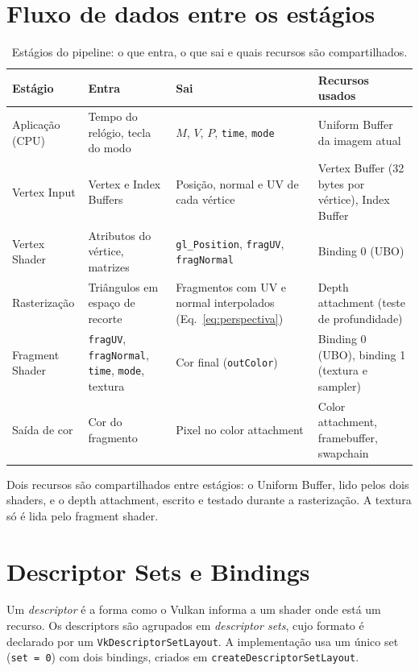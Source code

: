 \section{Fluxo de dados entre os estágios}

\begin{table}[H]
\centering
\caption{Estágios do pipeline: o que entra, o que sai e quais recursos são compartilhados.}
\label{tab:estagios}
\small
\begin{tabular}{p{2.5cm}p{3.6cm}p{3.6cm}p{4.1cm}}
\toprule
\textbf{Estágio} & \textbf{Entra} & \textbf{Sai} & \textbf{Recursos usados} \\
\midrule
Aplicação (CPU) & Tempo do relógio, tecla do modo & \(M\), \(V\), \(P\), \texttt{time}, \texttt{mode} & Uniform Buffer da imagem atual \\
Vertex Input & Vertex e Index Buffers & Posição, normal e UV de cada vértice & Vertex Buffer (32 bytes por vértice), Index Buffer \\
Vertex Shader & Atributos do vértice, matrizes & \texttt{gl\_Position}, \texttt{fragUV}, \texttt{fragNormal} & Binding 0 (UBO) \\
Rasterização & Triângulos em espaço de recorte & Fragmentos com UV e normal interpolados (Eq.~\ref{eq:perspectiva}) & Depth attachment (teste de profundidade) \\
Fragment Shader & \texttt{fragUV}, \texttt{fragNormal}, \texttt{time}, \texttt{mode}, textura & Cor final (\texttt{outColor}) & Binding 0 (UBO), binding 1 (textura e sampler) \\
Saída de cor & Cor do fragmento & Pixel no color attachment & Color attachment, framebuffer, swapchain \\
\bottomrule
\end{tabular}
\end{table}

Dois recursos são compartilhados entre estágios: o Uniform Buffer, lido pelos dois shaders, e o depth attachment, escrito e testado durante a rasterização. A textura só é lida pelo fragment shader.

\section{Descriptor Sets e Bindings}

Um \textit{descriptor} é a forma como o Vulkan informa a um shader onde está um recurso. Os descriptors são agrupados em \textit{descriptor sets}, cujo formato é declarado por um \texttt{VkDescriptorSetLayout}. A implementação usa um único set (\texttt{set = 0}) com dois bindings, criados em \texttt{createDescriptorSetLayout}.

